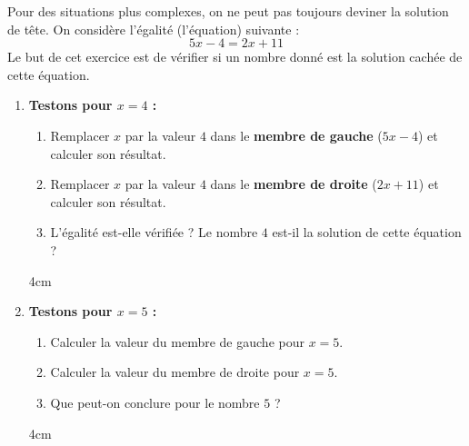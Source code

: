 \documentclass[a4paper]{book}
\begin{document}
    \begin{exercice}
        Pour des situations plus complexes, on ne peut pas toujours deviner la solution de tête. 
        On considère l'égalité (l'équation) suivante :
        \[ 5x - 4 = 2x + 11 \]
        Le but de cet exercice est de vérifier si un nombre donné est la solution cachée de cette équation.
        
        \begin{enumerate}
            \item \textbf{Testons pour $x = 4$ :}
            \begin{enumerate}
                \item Remplacer $x$ par la valeur $4$ dans le \textbf{membre de gauche} ($5x - 4$) et calculer son résultat.
                \item Remplacer $x$ par la valeur $4$ dans le \textbf{membre de droite} ($2x + 11$) et calculer son résultat.
                \item L'égalité est-elle vérifiée ? Le nombre $4$ est-il la solution de cette équation ?
            \end{enumerate}
            \begin{ZoneReponse}{4cm}
            \end{ZoneReponse}
            
            \vspace{0.4cm}
            
            \item \textbf{Testons pour $x = 5$ :}
            \begin{enumerate}
                \item Calculer la valeur du membre de gauche pour $x = 5$.
                \item Calculer la valeur du membre de droite pour $x = 5$.
                \item Que peut-on conclure pour le nombre $5$ ?
            \end{enumerate}
            \begin{ZoneReponse}{4cm}
            \end{ZoneReponse}
        \end{enumerate}
    \end{exercice}
\end{document}
